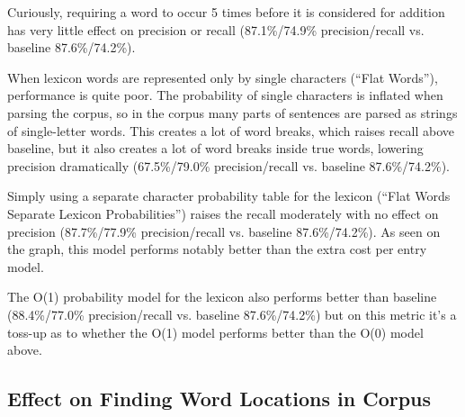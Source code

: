 \documentclass[11pt, oneside, fleqn]{article}
\begin{document}
 	Curiously, requiring a word to occur 5 times before it is considered for addition has very little effect on precision or recall (87.1\%/74.9\% precision/recall vs. baseline 87.6\%/74.2\%).

	When lexicon words are represented only by single characters (``Flat Words''), performance is quite poor. The probability of single characters is inflated when parsing the corpus, so in the corpus many parts of sentences are parsed as strings of single-letter words. This creates a lot of word breaks, which raises recall above baseline, but it also creates a lot of word breaks inside true words, lowering precision dramatically (67.5\%/79.0\% precision/recall vs. baseline 87.6\%/74.2\%).

	Simply using a separate character probability table for the lexicon (``Flat Words Separate Lexicon Probabilities'') raises the recall moderately with no effect on precision (87.7\%/77.9\% precision/recall vs. baseline 87.6\%/74.2\%). As seen on the graph, this model performs notably better than the extra cost per entry model.

	The O(1) probability model for the lexicon also performs better than baseline (88.4\%/77.0\% precision/recall vs. baseline 87.6\%/74.2\%) but on this metric it's a toss-up as to whether the O(1) model performs better than the O(0) model above.

  \subsection{Effect on Finding Word Locations in Corpus}
\end{document}
